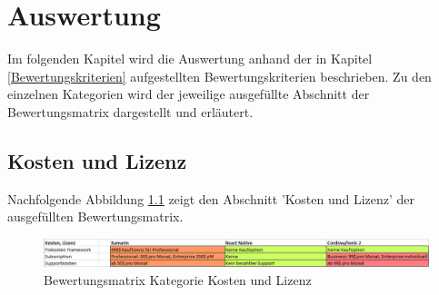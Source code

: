 \chapter{Auswertung} \label{Auswertung}

Im folgenden Kapitel wird die Auswertung anhand der in Kapitel \ref{Bewertungskriterien} aufgestellten Bewertungskriterien beschrieben. Zu den einzelnen Kategorien wird der jeweilige ausgefüllte Abschnitt der Bewertungsmatrix dargestellt und erläutert. 

\section{Kosten und Lizenz}

Nachfolgende Abbildung \ref{fig:AuswKostLiz} zeigt den Abschnitt 'Kosten und Lizenz' der ausgefüllten Bewertungsmatrix.

\begin{figure}[h]
	\centering
	\includegraphics[width=1\textwidth]{Bilder/Auswertung_KostenLizenz.PNG}
	\caption{Bewertungsmatrix Kategorie Kosten und Lizenz}
	\label{fig:AuswKostLiz}
\end{figure}

